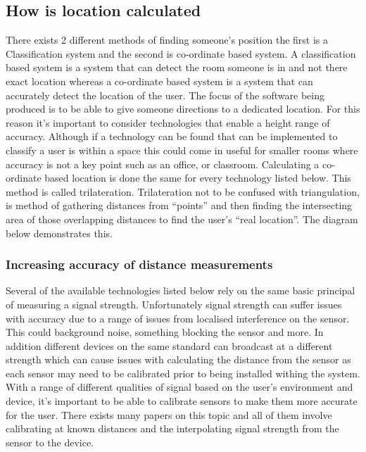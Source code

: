 \subsection{How is location calculated}
There exists 2 different methods of finding someone’s position the first is a Classification system and the second is co-ordinate based system. A classification based system is a system that can detect the room someone is in and not there exact location whereas a co-ordinate based system is a system that can accurately detect the location of the user.
The focus of the software being produced is to be able to give someone directions to a dedicated location. For this reason it’s important to consider technologies that enable a height range of accuracy. Although if a technology can be found that can be implemented to classify a user is within a space this could come in useful for smaller rooms where accuracy is not a key point such as an office, or classroom.
Calculating a co-ordinate based location is done the same for every technology listed below. This method is called trilateration. Trilateration not to be confused with triangulation, is method of gathering distances from “points” and then finding the intersecting area of those overlapping distances to find the user’s “real location”. The diagram below demonstrates this.

\subsubsection{Increasing accuracy of distance measurements}
Several of the available technologies listed below rely on the same basic principal of measuring a signal strength. Unfortunately signal strength can suffer issues with accuracy due to a range of issues from localised interference on the sensor. This could background noise, something blocking the sensor and more. In addition different devices on the same standard can broadcast at a different strength which can cause issues with calculating the distance from the sensor as each sensor may need to be calibrated prior to being installed withing the system. With a range of different qualities of signal based on the user’s environment and device, it’s important to be able to calibrate sensors to make them more accurate for the user. There exists many papers on this topic and all of them involve calibrating at known distances and the interpolating signal strength from the sensor to the device. 